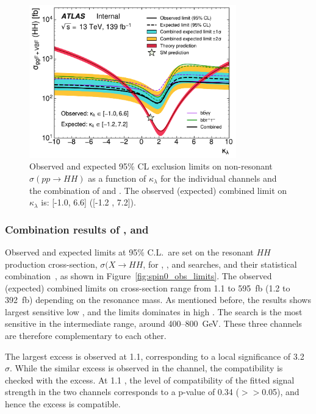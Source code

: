 \begin{figure}[htbp]
\centering
\includegraphics[width=0.8\textwidth]{DiHiggs/plots/kl_scan/20210926/all_channels_kl_scan_mH125.pdf}
\caption{Observed and expected 95\% CL exclusion limits on non-resonant $\sigma(pp \rightarrow HH)$ as a function of $\kappa_\lambda$ for the individual channels and the combination of \bbtt and \bbyy.
The observed (expected) combined limit on $\kappa_\lambda$ is:  [-1.0, 6.6]  ([-1.2 , 7.2]).
}
\label{fig:kl_scan_combined}
\end{figure}



\subsubsection{Combination results of  \texorpdfstring{\bbtt, \bbyy and \bbbb}{bbtt, bbyy and bbbb}}

Observed and expected limits at 95\% C.L.\  are set on the resonant $HH$ production cross-section, 
$\sigma(X \rightarrow HH$, for \bbyy, \bbtt, and \bbbb searches, and their statistical combination~\cite{ATLAS-CONF-2021-052},
as shown in 
Figure~\ref{fig:spin0_obs_limits}.
The observed (expected) combined limits on cross-section range from 1.1 to 595~fb (1.2 to 392~fb) depending 
on the resonance mass.
As mentioned before, the \bbyy results shows largest sensitive low \mX, and the \bbbb limits dominates in high \mX.
The \bbtt search is the most sensitive in the intermediate range, around 400--800~GeV.
These three channels are therefore complementary to each other. 

The largest excess is observed at \SI{1.1}{\tev}, corresponding to a local significance of
3.2~$\sigma$. While the similar excess is observed in the \bbtt channel, the compatibility 
is checked with the \bbbb excess. At 1.1 \tev, the level of compatibility
of the fitted signal strength in the two channels corresponds to a p-value
of 0.34 ($>>$0.05), and hence the excess is compatible.


